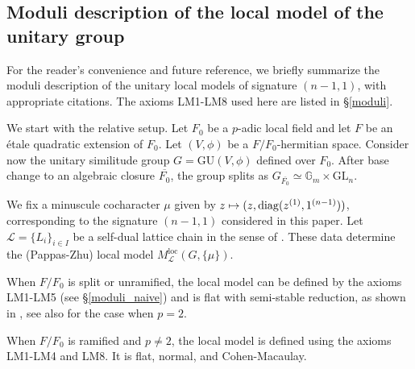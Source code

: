 \documentclass[pdflatex,sn-mathphys-num]{sn-jnl}%
\makeatletter
\theoremstyle{thmstyleone}%
\theoremstyle{thmstyletwo}%
\numberwithin{equation}{subsection}
\theoremstyle{thmstylethree}%
\newcommand{\BG}{\ensuremath{\mathbb{G}}\xspace}
\newcommand{\CL}{\ensuremath{\mathcal{L}}\xspace}
\newcommand{\GL}{\mathrm{GL}}
\newcommand{\GU}{\mathrm{GU}}
\newcommand{\loc}{\ensuremath{\mathrm{loc}}\xspace}
\newcommand{\ov}{\overline}
\let\shortmapsto\mapsto
\renewcommand{\mapsto}{%
		\ifbool{@display}{\longmapsto}{\shortmapsto}%
	}
\makeatother
\begin{document}
\subsection{Moduli description of the local model of the unitary group}\label{intro_moduli}
For the reader’s convenience and future reference, we briefly summarize the moduli description of the unitary local models of signature $(n-1,1)$, with appropriate citations.
The axioms {\selectfont LM1-LM8} used here are listed in \S \ref{moduli}.

We start with the relative setup. Let $F_0$ be a $p$-adic local field and let $F$ be an \'etale quadratic extension of $F_0$. 
Let $(V,\phi)$ be a $F/F_0$-hermitian space. Consider now the unitary similitude group $G=\GU(V,\phi)$ defined over $F_0$. After base change to an algebraic closure $\ov{F_0}$, the group splits as $G_{\ov{F_0}}\simeq \BG_m\times\GL_n$. 

We fix a minuscule cocharacter $\mu$ given by $z\mapsto (z,\mathrm{diag}(z^{(1)},1^{(n-1)}))$, corresponding to the signature $(n-1,1)$ considered in this paper. 
Let $\CL=\{L_i\}_{i\in I}$ be a self-dual lattice chain in the sense of \cite[Chapter 3]{RZ}. These data determine the (Pappas-Zhu) local model $M^{\loc}_{\CL}(G,\{\mu\})$. 

When $F/F_0$ is split or unramified, the local model can be defined by the axioms {\selectfont LM1-LM5} (see \S \ref{moduli_naive}) and is flat with semi-stable reduction, as shown in \cite{Gortz2001}, see also \cite[Appendix A]{RSZ-2021} for the case when $p=2$. 

When $F/F_0$ is ramified and $p\neq 2$, the local model is defined using the axioms {\selectfont LM1-LM4} and {\selectfont LM8}. It is flat, normal, and Cohen-Macaulay. 
\end{document}
